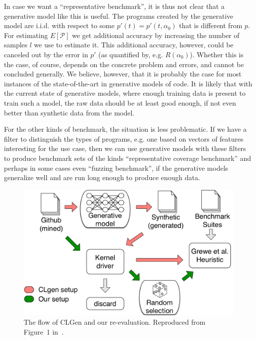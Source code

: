 In case we want a ``representative benchmark'', it is thus not clear that a generative model like this is useful.
The programs created by the generative model are i.i.d. with respect to some $p'(t) = p'(t,\alpha_0)$ that is different from $p$.
For estimating $E[\mathcal{P}]$ we get additional accuracy by increasing the number of samples $l$ we use to estimate it.
This additional accuracy, however, could be canceled out by the error in $p'$ (as quantified by, e.g. $R(\alpha_0)$).
Whether this is the case, of course, depends on the concrete problem and errors, and cannot be concluded generally.
We believe, however, that it is probably the case for most instances of the state-of-the-art in generative models of code.
It is likely that with the current state of generative models, where enough training data is present to train such a model, the raw data should be at least good enough, if not even better than synthetic data from the model.

For the other kinds of benchmark, the situation is less problematic.
If we have a filter to distinguish the types of programs, e.g. one based on vectors of features interesting for the use case, then we can use generative models with these filters to produce benchmark sets of the kinds ``representative coverage benchmark'' and perhaps in some cases even ``fuzzing benchmark'', if the generative models generalize well and are run long enough to produce enough data.

\begin{figure}[th]
	\centering
	\includegraphics[width=.8\textwidth]{figures/clgen_flow.pdf}
	\caption{The flow of CLGen and our re-evaluation. Reproduced from Figure~1 in~\cite{goens_mapl19}.}
	\label{fig:clgen_flow}
\end{figure}

